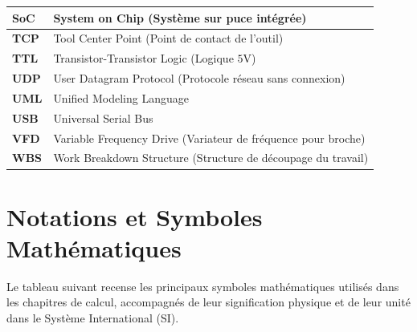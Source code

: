 \begin{longtable}{|l|p{10.5cm}|}
\hline
\textbf{SoC} & System on Chip (Système sur puce intégrée) \\
\hline
\textbf{TCP} & Tool Center Point (Point de contact de l'outil) \\
\hline
\textbf{TTL} & Transistor-Transistor Logic (Logique $5\text{V}$) \\
\hline
\textbf{UDP} & User Datagram Protocol (Protocole réseau sans connexion) \\
\hline
\textbf{UML} & Unified Modeling Language \\
\hline
\textbf{USB} & Universal Serial Bus \\
\hline
\textbf{VFD} & Variable Frequency Drive (Variateur de fréquence pour broche) \\
\hline
\textbf{WBS} & Work Breakdown Structure (Structure de découpage du travail) \\
\hline
\end{longtable}
\newpage
\chapter*{Notations et Symboles Mathématiques}

Le tableau suivant recense les principaux symboles mathématiques utilisés dans les chapitres de calcul, accompagnés de leur signification physique et de leur unité dans le Système International (SI).

